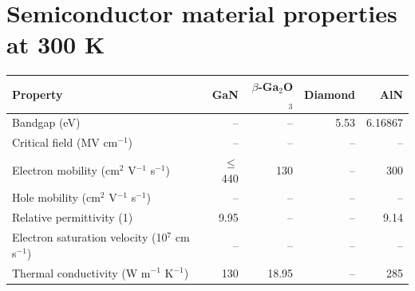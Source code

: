 \documentclass{article}
\begin{document}
\section*{Semiconductor material properties at 300 K}
\begin{tabular}{lrrrr}
\toprule
Property & GaN & $\beta$-Ga$_2$O$_3$ & Diamond & AlN \\
\midrule
Bandgap (eV) & -- & -- & 5.53 & 6.16867 \\
Critical field (MV cm$^{-1}$) & -- & -- & -- & -- \\
Electron mobility (cm$^2$ V$^{-1}$ s$^{-1}$) & $\leq$440 & 130 & -- & 300 \\
Hole mobility (cm$^2$ V$^{-1}$ s$^{-1}$) & -- & -- & -- & -- \\
Relative permittivity (1) & 9.95 & -- & -- & 9.14 \\
Electron saturation velocity (10$^7$ cm s$^{-1}$) & -- & -- & -- & -- \\
Thermal conductivity (W m$^{-1}$ K$^{-1}$) & 130 & 18.95 & -- & 285 \\
\bottomrule
\end{tabular}
\end{document}
